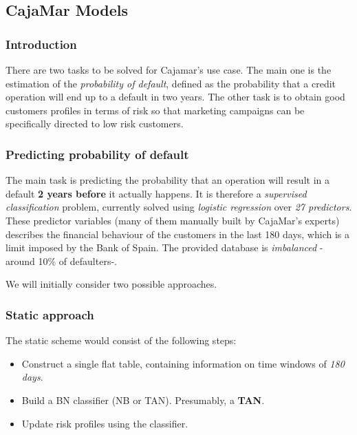 \subsection{CajaMar Models}
\label{Section:CajaMarModels}

\subsubsection*{Introduction}

There are two tasks to be solved for Cajamar's use case. The main one is
the estimation of the \emph{probability of default}, defined as the probability that a
credit operation will end up to a default in two years. The other task is to obtain 
good customers profiles in terms of risk so that marketing campaigns can be
specifically directed to low risk customers. 

\subsubsection*{Predicting probability of default}


The main task is predicting the probability that an operation will result in a default
\textbf{2 years before} it actually happens. It is therefore a \emph{supervised classification} problem,
currently solved using \emph{logistic regression} over \emph{27 predictors}. These predictor variables (many  of them manually built by CajaMar's experts) 
describes the financial behaviour of the customers in the last 180 days, which is a limit imposed by the Bank of Spain.  The provided database is \emph{imbalanced} -around 10\% of defaulters-. 

We will initially consider two possible approaches.

\subsubsection*{Static approach} 

The static scheme would consist of the following steps:


\begin{itemize}
\item Construct a single flat table, containing information on time windows of \emph{180 days}.
\item Build a BN classifier (NB or TAN). Presumably, a \textbf{TAN}.
\item Update risk profiles using the classifier.
\end{itemize}

